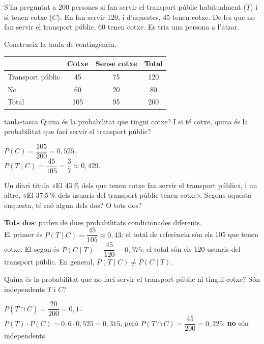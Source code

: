 S'ha preguntat a 200 persones si fan servir el transport públic habitualment ($T$) i si tenen cotxe ($C$).
En fan servir 120, i d'aquestes, 45 tenen cotxe. De les que no fan servir el transport públic, 60 tenen
cotxe. Es tria una persona a l'atzar.

\begin{apartats}

Construeix la taula de contingència.

\begin{solucio}
\begin{center}
\begin{tabular}{l|cc|c}
 & Cotxe & Sense cotxe & Total\\ \hline
Transport públic & 45 & 75 & 120\\
No & 60 & 20 & 80\\ \hline
Total & 105 & 95 & 200
\end{tabular}
\end{center}
\end{solucio}

\begin{tria}{taula-tasca}
Quina és la probabilitat que tingui cotxe? I si té cotxe, quina és la probabilitat que faci servir el
transport públic?

\begin{solucio}
$P(C)=\dfrac{105}{200}=0{,}525$.\\
$P(T\mid C)=\dfrac{45}{105}=\dfrac37\approx0{,}429$.
\end{solucio}

Un diari titula «El 43\,\% dels que tenen cotxe fan servir el transport públic», i un altre, «El 37,5\,\%
dels usuaris del transport públic tenen cotxe». Segons aquesta enquesta, té raó algun dels dos? O tots
dos?

\begin{solucio}
\textbf{Tots dos}: parlen de dues probabilitats condicionades diferents.\\
El primer és $P(T\mid C)=\dfrac{45}{105}\approx0{,}43$: el total de referència són els 105 que tenen
cotxe. El segon és $P(C\mid T)=\dfrac{45}{120}=0{,}375$: el total són els 120 usuaris del transport
públic. En general, $P(T\mid C)\neq P(C\mid T)$.
\end{solucio}
\end{tria}

\begin{nomesllarg}
Quina és la probabilitat que no faci servir el transport públic ni tingui cotxe? Són independents $T$ i
$C$?

\begin{solucio}
$P\left(\overline{T}\cap\overline{C}\right)=\dfrac{20}{200}=0{,}1$.\\
$P(T)\cdot P(C)=0{,}6\cdot0{,}525=0{,}315$, però $P(T\cap C)=\dfrac{45}{200}=0{,}225$: \textbf{no} són
independents.
\end{solucio}
\end{nomesllarg}

\end{apartats}
